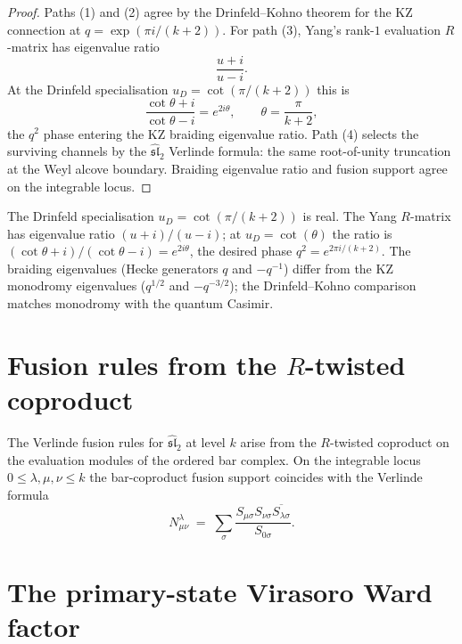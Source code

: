 \begin{proof}
Paths (1) and (2) agree by the Drinfeld--Kohno theorem for the KZ
connection at $q=\exp(\pi i/(k+2))$. For path (3), Yang's rank-$1$
evaluation $R$-matrix has eigenvalue ratio
\[
\frac{u+i}{u-i}.
\]
At the Drinfeld specialisation $u_D=\cot(\pi/(k+2))$ this is
\[
\frac{\cot\theta+i}{\cot\theta-i}=e^{2i\theta},
\qquad \theta=\frac{\pi}{k+2},
\]
the $q^2$ phase entering the KZ braiding eigenvalue ratio. Path
(4) selects the surviving channels by the
$\widehat{\mathfrak{sl}}_2$ Verlinde formula: the same
root-of-unity truncation at the Weyl alcove boundary. Braiding
eigenvalue ratio and fusion support agree on the integrable locus.
\end{proof}

\begin{remark}
\label{rem:dnp-master-drinfeld-real}
The Drinfeld specialisation $u_D = \cot(\pi/(k+2))$ is real. The
Yang $R$-matrix has eigenvalue ratio $(u+i)/(u-i)$; at
$u_D = \cot(\theta)$ the ratio is
$(\cot\theta + i)/(\cot\theta - i) = e^{2i\theta}$, the desired
phase $q^2 = e^{2\pi i/(k+2)}$. The braiding eigenvalues (Hecke
generators $q$ and $-q^{-1}$) differ from the KZ monodromy
eigenvalues ($q^{1/2}$ and $-q^{-3/2}$); the Drinfeld--Kohno
comparison matches monodromy with the quantum Casimir.
\end{remark}

\section{Fusion rules from the $R$-twisted coproduct}
\label{sec:dnp-master-fusion}

The Verlinde fusion rules for $\widehat{\mathfrak{sl}}_2$ at level
$k$ arise from the $R$-twisted coproduct on the evaluation modules
of the ordered bar complex. On the integrable locus
$0\leq \lambda,\mu,\nu\leq k$ the bar-coproduct fusion support
coincides with the Verlinde formula
\[
N^\lambda_{\mu\nu}
\;=\;
\sum_{\sigma}
\frac{S_{\mu\sigma} S_{\nu\sigma} \overline{S_{\lambda\sigma}}}{S_{0\sigma}}.
\]

\section{The primary-state Virasoro Ward factor}
\label{sec:dnp-master-virasoro-r}

